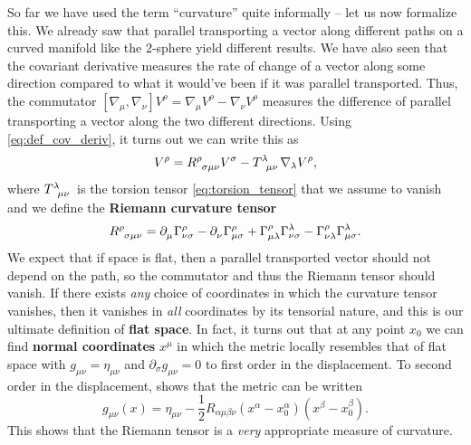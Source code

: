 So far we have used the term ``curvature'' quite informally -- let us now formalize this.
We already saw that parallel transporting a vector along different paths on a curved manifold like the $2$-sphere yield different results.
We have also seen that the covariant derivative measures the rate of change of a vector along some direction compared to what it would've been if it was parallel transported.
Thus, the commutator $[ \nabla_\mu, \nabla_\nu ] V^\rho = \nabla_\mu V^\rho - \nabla_\nu V^\rho$ measures the difference of parallel transporting a vector along the two different directions.
Using \cref{eq:def_cov_deriv}, it turns out we can write this as
\begin{equation}
	[ \nabla_\mu, \nabla_\nu ] V^\rho = R\indices{^\rho_{\sigma \mu \nu}} V^\sigma - T\indices{^\lambda_{\mu \nu}} \nabla_\lambda V^\rho ,
\end{equation}
where $T\indices{^\lambda_{\mu \nu}}$ is the torsion tensor \eqref{eq:torsion_tensor} that we assume to vanish and we define the \textbf{Riemann curvature tensor}
\begin{equation}
	R\indices{^\rho_\sigma_\mu_\nu} =
	\partial\indices{_\mu} \Gamma^\rho_{\nu \sigma} -
	\partial\indices{_\nu} \Gamma^{\rho}_{\mu \sigma} +
	\Gamma^\rho_{\mu \lambda} \Gamma^{\lambda}_{\nu \sigma} -
	\Gamma^\rho_{\nu \lambda} \Gamma^{\lambda}_{\mu \sigma} .
	\label{eq:def_riemann_tensor}
\end{equation}
We expect that if space is flat, then a parallel transported vector should not depend on the path, so the commutator and thus the Riemann tensor should vanish.
If there exists \emph{any} choice of coordinates in which the curvature tensor vanishes, then it vanishes in \emph{all} coordinates by its tensorial nature, and this is our ultimate definition of \textbf{flat space}.
In fact, it turns out that at any point $x_0$ we can find \textbf{normal coordinates} $x^\mu$ in which the metric locally resembles that of flat space with $g_{\mu \nu} = \eta_{\mu \nu}$ and $\partial_\sigma g_{\mu \nu} = 0$ to first order in the displacement.
To second order in the displacement, \cite{ref:metric_taylor_expansion} shows that the metric can be written
\begin{equation}
	g_{\mu \nu}(x) = \eta_{\mu \nu} - \frac12 R_{\alpha \mu \beta \nu} (x^\alpha - x_0^\alpha) (x^\beta - x_0^\beta) .
\end{equation}
This shows that the Riemann tensor is a \emph{very} appropriate measure of curvature.



